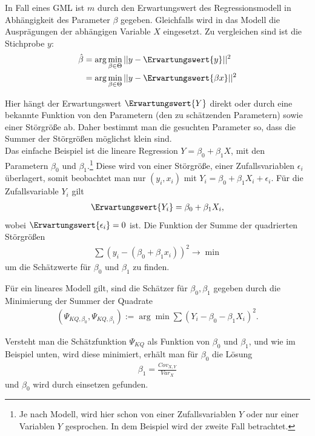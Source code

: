 In Fall eines \gls{GML} ist $m$ durch den Erwartungswert des Regressionsmodell in Abhängigkeit des Parameter $\beta$ gegeben. Gleichfalls wird in das Modell die Ausprägungen der abhängigen Variable $X$ eingesetzt. Zu vergleichen sind ist die Stichprobe $y$:
\begin{align}
	\hat{\beta} &= \arg\min_{\beta\in\Theta} ||y - \Erwartungswert{y} ||^2\\
	 &= \arg\min_{\beta\in\Theta} ||y - \Erwartungswert{\beta x} ||^2\\
\end{align}


Hier hängt der Erwartungswert $\Erwartungswert{Y}$ direkt oder durch eine bekannte Funktion von den Parametern (den zu schätzenden Parametern) sowie einer Störgröße ab. Daher bestimmt man die gesuchten Parameter so, dass die Summer der Störgrößen möglichst klein sind.\\

Das einfache Beispiel ist die lineare Regression $Y=\beta_0 + \beta_1X$, mit den Parametern $\beta_0$ und $\beta_1$.\footnote{Je nach Modell, wird hier schon von einer Zufallsvariablen $Y$ oder nur einer Variablen $Y$ gesprochen. In dem Beispiel wird der zweite Fall betrachtet.} Diese wird von einer Störgröße, einer Zufallsvariablen $\epsilon_i$ überlagert, somit beobachtet man nur $(y_i,x_i)$ mit $Y_i = \beta_0 + \beta_1X_i + \epsilon_i $. Für die Zufallsvariable $Y_i$ gilt
\begin{align}
	\Erwartungswert{Y_i} = \beta_0 + \beta_1X_i,
\end{align}
wobei $\Erwartungswert{\epsilon_i} = 0$ ist. Die Funktion der Summe der quadrierten Störgrößen 
\begin{align}
	\sum \left(y_i - (\beta_0 + \beta_1x_i)	\right)^2 \rightarrow \min
\end{align}
um die Schätzwerte für $\beta_0$ und $\beta_1$ zu finden.

Für ein lineares Modell gilt,	 sind die Schätzer für $\beta_0, \beta_1$ gegeben durch die Minimierung der Summer der Quadrate
\begin{align}
	(\Psi_{KQ, \beta_0}, \Psi_{KQ,\beta_1}) := \arg\min \sum (Y_i - \beta_0 - \beta_1X_i)^2.
\end{align}

Versteht man die Schätzfunktion $\Psi_{KQ}$ als Funktion von $\beta_0$ und $\beta_1$, und wie im Beispiel unten, wird diese minimiert, erhält man für $\beta_0$ die Lösung
\begin{align}
	\beta_1 = \frac{Cov_{X,Y}}{Var_{X}}
\end{align}
und $\beta_0$ wird durch einsetzen gefunden.
	
